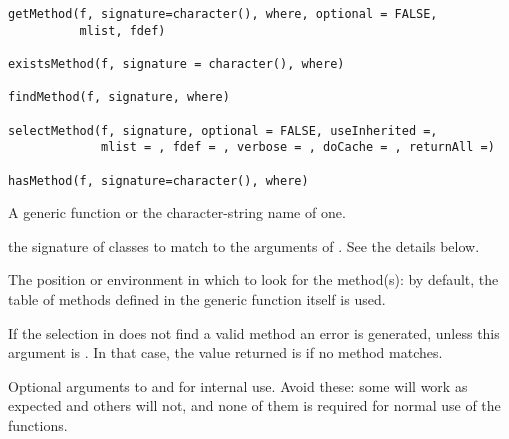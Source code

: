 %
\begin{Usage}
\begin{verbatim}
getMethod(f, signature=character(), where, optional = FALSE,
          mlist, fdef)

existsMethod(f, signature = character(), where)

findMethod(f, signature, where)

selectMethod(f, signature, optional = FALSE, useInherited =,
             mlist = , fdef = , verbose = , doCache = , returnAll =)

hasMethod(f, signature=character(), where)

\end{verbatim}
\end{Usage}
%
\begin{Arguments}
\begin{ldescription}
\item[\code{f}] A  generic function or the character-string name of one.
\item[\code{signature}] the signature of classes to match to the arguments
of .  See the details below.


\item[\code{where}] The position or environment in which to look for the
method(s):  by default, the table of methods defined in the generic function itself is used.

\item[\code{optional}] If the selection in  does not find a valid method
an error is generated, unless this argument is .  In that
case, the value returned is  if no method matches.
\item[\code{mlist, fdef, useInherited, verbose, doCache, returnAll}] Optional
arguments  to   and  for
internal use.  Avoid
these: some will work as expected and others will not, and none of them is required for normal use of the functions.


\end{ldescription}
\end{Arguments}
%
